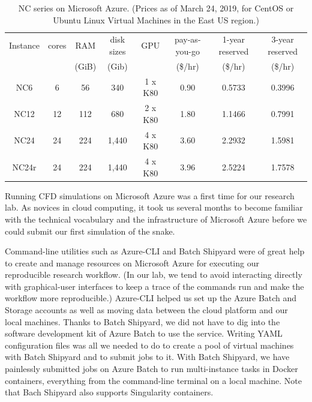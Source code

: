 \documentclass[10pt,journal,compsoc]{IEEEtran}
\begin{document}
\begin{table}[!h]
    \renewcommand{\arraystretch}{1.5}
    \caption{NC series on Microsoft Azure. (Prices as of March 24, 2019, for CentOS or Ubuntu Linux Virtual Machines in the East US region.)}
    \label{tab:nc_series}
    \centering
    \begin{tabular}{cccccccc}
        Instance & cores & RAM & disk sizes & GPU & pay-as-you-go & 1-year reserved & 3-year reserved \\
        && (GiB) & (Gib) && (\$/hr) & (\$/hr) & (\$/hr) \\
        \hline
        NC6 & 6 & 56 & 340 & 1 x K80 & 0.90 & 0.5733 & 0.3996 \\
        NC12 & 12 & 112 & 680 & 2 x K80 & 1.80 & 1.1466 & 0.7991 \\
        NC24 & 24 & 224 & 1,440 & 4 x K80 & 3.60 & 2.2932 & 1.5981 \\
        NC24r\footnotemark & 24 & 224 & 1,440 & 4 x K80 & 3.96 & 2.5224 & 1.7578 \\
        \hline
    \end{tabular}
\end{table}


Running CFD simulations on Microsoft Azure was a first time for our research lab.
As novices in cloud computing, it took us several months to become familiar with the technical vocabulary and the infrastructure of Microsoft Azure before we could submit our first simulation of the snake.

Command-line utilities such as Azure-CLI and Batch Shipyard were of great help to create and manage resources on Microsoft Azure for executing our reproducible research workflow.
(In our lab, we tend to avoid interacting directly with graphical-user interfaces to keep a trace of the commands run and make the workflow more reproducible.)
Azure-CLI helped us set up the Azure Batch and Storage accounts as well as moving data between the cloud platform and our local machines.
Thanks to Batch Shipyard, we did not have to dig into the software development kit of Azure Batch to use the service.
Writing YAML configuration files was all we needed to do to create a pool of virtual machines with Batch Shipyard and to submit jobs to it.
With Batch Shipyard, we have painlessly submitted jobs on Azure Batch to run multi-instance tasks in Docker containers, everything from the command-line terminal on a local machine.
Note that Bach Shipyard also supports Singularity containers.
\end{document}
